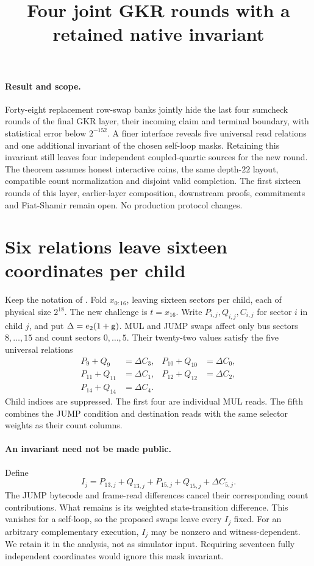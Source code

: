 \documentclass[11pt]{article}
\title{Four joint GKR rounds with a retained native invariant}
\author{}
\date{}
\begin{document}
\maketitle
\vspace{-2em}

\paragraph{Result and scope.} Forty-eight replacement row-swap banks jointly hide the last four sumcheck rounds of the final GKR layer, their incoming claim and terminal boundary, with statistical error below $2^{-152}$. A finer interface reveals five universal read relations and one additional invariant of the chosen self-loop masks. Retaining this invariant still leaves four independent coupled-quartic sources for the new round. The theorem assumes honest interactive coins, the same depth-$22$ layout, compatible count normalization and disjoint valid completion. The first sixteen rounds of this layer, earlier-layer composition, downstream proofs, commitments and Fiat-Shamir remain open. No production protocol changes.

\section{Six relations leave sixteen coordinates per child}

Keep the notation of . Fold $x_{0:16}$, leaving sixteen sectors per child, each of physical size $2^{18}$. The new challenge is $t=x_{16}$. Write $P_{i,j},Q_{i,j},C_{i,j}$ for sector $i$ in child $j$, and put $\Delta=e_2(1+\mathsf{g})$. MUL and JUMP swaps affect only bus sectors $8,\ldots,15$ and count sectors $0,\ldots,5$. Their twenty-two values satisfy the five universal relations
\[
\begin{aligned}
 P_9+Q_9&=\Delta C_3,& P_{10}+Q_{10}&=\Delta C_0,\\
 P_{11}+Q_{11}&=\Delta C_1,& P_{12}+Q_{12}&=\Delta C_2,\\
 P_{14}+Q_{14}&=\Delta C_4.
\end{aligned}
\]
Child indices are suppressed. The first four are individual MUL reads. The fifth combines the JUMP condition and destination reads with the same selector weights as their count columns.

\paragraph{An invariant need not be made public.} Define
\[
 I_j=P_{13,j}+Q_{13,j}+P_{15,j}+Q_{15,j}+\Delta C_{5,j}.
\]
The JUMP bytecode and frame-read differences cancel their corresponding count contributions. What remains is its weighted state-transition difference. This vanishes for a self-loop, so the proposed swaps leave every $I_j$ fixed. For an arbitrary complementary execution, $I_j$ may be nonzero and witness-dependent. We retain it in the analysis, not as simulator input. Requiring seventeen fully independent coordinates would ignore this mask invariant.
\end{document}
